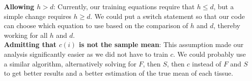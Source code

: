 \documentclass{article}
\begin{document}
{\bf Allowing $h > d$}: Currently, our training equations require that $h \leq d$, but a simple change requires $h \geq d$. We could put a switch statement so that our code can choose which equation to use based on the comparison of $h$ and $d$, thereby working for all $h$ and $d$. \\

{\bf Admitting that $c(i)$ is not the sample mean}: This assumption made our analysis significantly easier as we did not have to train $c$. We could probably use a similar algorithm, alternatively solving for $F$, then $S$, then $c$ instead of $F$ and $S$ to get better results and a better estimation of the true mean of each tissue. \\












%
\end{document}

